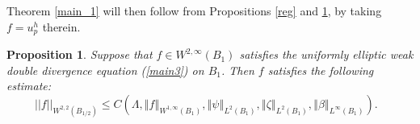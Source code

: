 \documentclass[12pt,leqno]{amsart}%
\theoremstyle{plain}
\newtheorem{proposition}{Proposition}[section]
\numberwithin{equation}{section}
\theoremstyle{definition}
\begin{document}
Theorem \ref{main_1} will then follow from Propositions \ref{reg} and
\ref{reg3}, by taking $f=u^{h}_{p}$ therein.


\begin{proposition}
\label{reg3} Suppose that $f\in W^{2,\infty}(B_{1})$ satisfies the uniformly
elliptic weak double divergence equation (\ref{main3}) on $B_{1}$. Then $f$
satisfies the following estimate:
\begin{equation}
||f||_{W^{2,2}(B_{1/2})}\leq C\left(  \Lambda,\left\Vert f\right\Vert
_{W^{1,\infty}(B_{1})},\left\Vert \psi\right\Vert _{L^{2}(B_{1})},\left\Vert
\zeta\right\Vert _{L^{2}(B_{1})},\left\Vert \beta\right\Vert _{L^{\infty
}(B_{1})}\right)  .\text{ }%
\end{equation}

\end{proposition}
\end{document}

